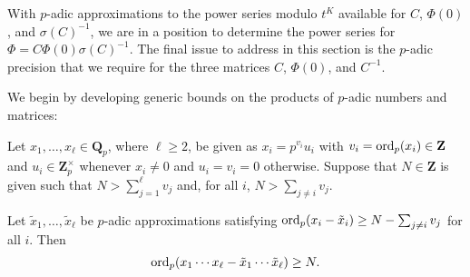With $p$-adic approximations to the power series modulo $t^K$ available 
for $C$, $\Phi(0)$, and $\sigma(C)^{-1}$, we are in a position to determine 
the power series for $\Phi = C \Phi(0) \sigma(C)^{-1}$.  The final issue 
to address in this section is the $p$-adic precision that we require for 
the three matrices $C$, $\Phi(0)$, and $C^{-1}$.

We begin by developing generic bounds on the products of $p$-adic numbers 
and matrices:

\begin{prop} \label{prop:productval}
Let $x_1, \dotsc, x_{\ell} \in \mathbf{Q}_p$, where $\ell \geq 2$, 
be given as $x_i = p^{v_i} u_i$ with $v_i = \operatorname{ord}_p(x_i) \in \mathbf{Z}$ 
and $u_i \in \mathbf{Z}_p^{\times}$ whenever $x_i \neq 0$ and 
$u_i = v_i = 0$ otherwise.  Suppose that $N \in \mathbf{Z}$ is given 
such that $N > \sum_{j=1}^{\ell} v_j$ and, for all $i$, $N > \sum_{j \neq i} v_j$.

Let $\tilde{x}_1, \dotsc, \tilde{x}_{\ell}$ be $p$-adic approximations 
satisfying $\operatorname{ord}_p(x_i - \tilde{x}_i) \geq N - \sum_{j \neq i} v_j$ 
for all $i$.  Then 
\begin{equation*}
\operatorname{ord}_p(x_1 \dotsm x_{\ell} - \tilde{x}_1 \dotsm \tilde{x}_{\ell}) \geq N.
\end{equation*}
\end{prop}

